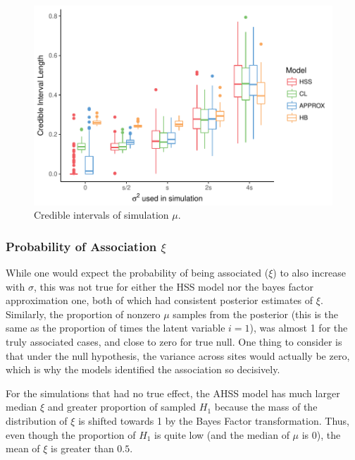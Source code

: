 \documentclass[AMA,STIX1COL]{WileyNJD-v2}\usepackage[]{graphicx}\usepackage[]{color}
\newenvironment{knitrout}{}{} %
\begin{document}
\begin{figure}
\caption{Credible intervals of simulation $\mu$.}
\begin{knitrout}
\color{fgcolor}

{\centering \includegraphics[width=6in]{figure/unnamed-chunk-22-1} 

}



\end{knitrout}
\end{figure}

\subsubsection{Probability of Association $\xi$}

While one would expect the probability of being associated ($\xi$) to also increase with $\sigma$, this was not true for either the HSS model nor the bayes factor approximation one, both of which had consistent posterior estimates of $\xi$. Similarly, the proportion of nonzero $\mu$ samples from the posterior (this is the same as the proportion of times the latent variable $i = 1$), was almost 1 for the truly associated cases, and close to zero for true null. One thing to consider is that under the null hypothesis, the variance across sites would actually be zero, which is why the models identified the association so decisively.

For the simulations that had no true effect, the AHSS model has much larger median $\xi$ and greater proportion of sampled $H_1$ because the mass of the distribution of $\xi$ is shifted towards 1 by the Bayes Factor transformation. Thus, even though the proportion of $H_1$ is quite low (and the median of $\mu$ is 0), the mean of $\xi$ is greater than $0.5$.
\end{document}
